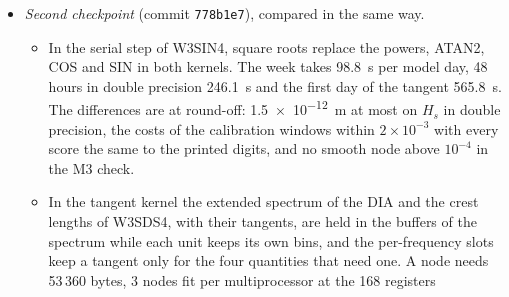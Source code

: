\documentclass[11pt,a4paper]{article}
\begin{document}
\begin{itemize}
\begin{itemize}
69\,351) change by at most $6\times10^{-3}$ with every score the same to
the printed digits.
\item In the tangent kernel the constants per frequency of W3SIN4 are
computed before its loop (identical bit for bit, 843.8 to \SI{798.0}{s}
for the first day; in the value kernel they raise the registers of
single precision from 128 to 168 per unit, so 3 nodes fit per
multiprocessor instead of 4 and the week takes \SI{117.3}{s}, and they
are left out there). The source sums and their tangents are
kept by the unit of each bin, the DIA does each pass for the values then
for the tangents in the same two buffers, and W3SDS4 and W3SIN4 use the
DIA buffers as scratch: a node needs 76\,192 instead of 156\,832 bytes,
2 nodes fit per multiprocessor, and the first day takes \SI{590.2}{s}
instead of \SI{931.4}{s}. The differences are at round-off
(\SI{3.1e-14}{m} on $H_s$, \SI{9.9e-11}{m} on its tangent), and the M3
check of the source tangent gives the same medians, 99th percentiles and
maxima in every direction on the harnesses of grids v5 and v4 (job
4447407). The same per-unit sums slow the single-precision value kernel
(\SI{143.2}{s}) and are not used there, and 64 units per cube are slower
than 128.
\item Overall: 124.1 to \SI{101.7}{s} per model day in single precision
($-18\,\%$), 505.1 to \SI{266.4}{s} in double precision ($-47\,\%$),
931.4 to \SI{590.2}{s} for the tangent ($-37\,\%$).
\end{itemize}
\item \emph{Second checkpoint} (commit \texttt{778b1e7}), compared in the
same way.
\begin{itemize}
\item In the serial step of W3SIN4, square roots replace the powers,
ATAN2, COS and SIN in both kernels. The week takes \SI{98.8}{s} per
model day, 48 hours in double precision \SI{246.1}{s} and the first day
of the tangent \SI{565.8}{s}. The differences are at round-off:
\SI{1.5e-12}{m} at most on $H_s$ in double precision, the costs of the
calibration windows within $2\times10^{-3}$ with every score the same to
the printed digits, and no smooth node above $10^{-4}$ in the M3 check.
\item In the tangent kernel the extended spectrum of the DIA and the
crest lengths of W3SDS4, with their tangents, are held in the buffers of
the spectrum while each unit keeps its own bins, and the per-frequency
slots keep a tangent only for the four quantities that need one. A node
needs 53\,360 bytes, 3 nodes fit per multiprocessor at the 168 registers

\end{itemize}
\end{itemize}
\end{document}
